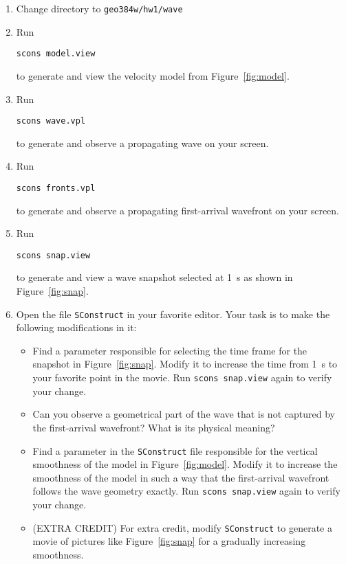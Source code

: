 \begin{enumerate}
\item Change directory to \verb#geo384w/hw1/wave#
\item Run
\begin{verbatim}
scons model.view
\end{verbatim}
to generate and view the velocity model from Figure~\ref{fig:model}.
\item Run
\begin{verbatim}
scons wave.vpl
\end{verbatim}
to generate and observe a propagating wave on your screen.
\item Run
\begin{verbatim}
scons fronts.vpl
\end{verbatim}
to generate and observe a propagating first-arrival wavefront on your screen.
\item Run
\begin{verbatim}
scons snap.view
\end{verbatim}
to generate and view a wave snapshot selected at 1~s as shown in
Figure~\ref{fig:snap}.
\item Open the file \texttt{SConstruct} in your favorite editor. Your task is to make the following modifications in it:
\begin{itemize}
\item Find a parameter responsible for selecting the time frame for the snapshot in Figure~\ref{fig:snap}. 
Modify it to increase the time from 1~s to your favorite point in the
movie. Run \texttt{scons snap.view} again to verify your change.
\item Can you observe a geometrical part of the wave that is not captured by the first-arrival wavefront? What is its physical meaning?
\item Find a parameter in the \texttt{SConstruct} file 
responsible for the vertical smoothness of the model in Figure~\ref{fig:model}. Modify it to increase the smoothness of the model in such a way 
that the first-arrival wavefront follows the wave geometry exactly. Run \texttt{scons snap.view} again to verify your change.
\item (EXTRA CREDIT) For extra credit, modify  \texttt{SConstruct} to generate a movie of pictures like Figure~\ref{fig:snap} for a gradually increasing smoothness.
\end{itemize}
\end{enumerate}

\lstset{language=python,numbers=left,numberstyle=\tiny,showstringspaces=false}


